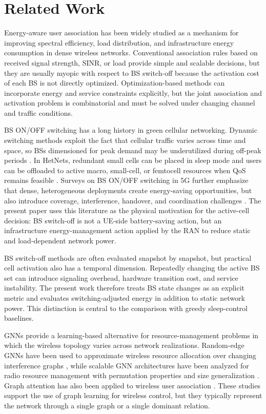 \documentclass[journal]{IEEEtran}
\begin{document}
\section{Related Work}
Energy-aware user association has been widely studied as a mechanism for
improving spectral efficiency, load distribution, and infrastructure energy
consumption in dense wireless networks. Conventional association rules based on
received signal strength, SINR, or load provide simple and scalable decisions,
but they are usually myopic with respect to BS switch-off because the
activation cost of each BS is not directly optimized. Optimization-based
methods can incorporate energy and service constraints explicitly, but the
joint association and activation problem is combinatorial and must be solved
under changing channel and traffic conditions.

BS ON/OFF switching has a long history in green cellular networking. Dynamic
switching methods exploit the fact that cellular traffic varies across time and
space, so BSs dimensioned for peak demand may be underutilized during off-peak
periods \cite{oh2013dynamic}. In HetNets, redundant small cells can be placed in
sleep mode and users can be offloaded to active macro, small-cell, or femtocell
resources when QoS remains feasible \cite{ghazzai2017green}. Surveys on BS
ON/OFF switching in 5G further emphasize that dense, heterogeneous deployments
create energy-saving opportunities, but also introduce coverage, interference,
handover, and coordination challenges \cite{feng2017onoff}. The present paper
uses this literature as the physical motivation for the active-cell decision:
BS switch-off is not a UE-side battery-saving action, but an infrastructure
energy-management action applied by the RAN to reduce static and
load-dependent network power.

BS switch-off methods are often evaluated snapshot by snapshot, but practical
cell activation also has a temporal dimension. Repeatedly changing the active
BS set can introduce signaling overhead, hardware transition cost, and service
instability. The present work therefore treats BS state changes as an explicit
metric and evaluates switching-adjusted energy in addition to static network
power. This distinction is central to the comparison with greedy sleep-control
baselines.

GNNs provide a learning-based alternative for resource-management problems in
which the wireless topology varies across network realizations. Random-edge
GNNs have been used to approximate wireless resource allocation over changing
interference graphs \cite{eisen2020optimal}, while scalable GNN architectures
have been analyzed for radio resource management with permutation properties
and size generalization \cite{shen2021scalable}. Graph attention has also been
applied to wireless user association \cite{mirzaei2025gatua}. These studies
support the use of graph learning for wireless control, but they typically
represent the network through a single graph or a single dominant relation.
\end{document}

